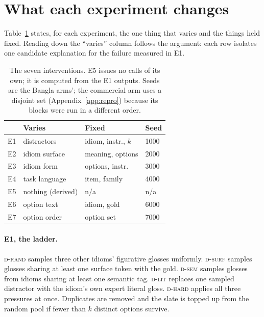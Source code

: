 \documentclass[11pt]{article}
\newcommand{\neu}[1]{\cellcolor{fGrey!55}#1}
\newcommand{\Drand}{\textsc{d-rand}}
\newcommand{\Dsurf}{\textsc{d-surf}}
\newcommand{\Dsem}{\textsc{d-sem}}
\newcommand{\Dlit}{\textsc{d-lit}}
\newcommand{\Dhard}{\textsc{d-hard}}
\begin{document}
\section{What each experiment changes}
\label{app:experiments}

Table~\ref{tab:expgrid} states, for each experiment, the one thing that varies
and the things held fixed. Reading down the ``varies'' column follows the
argument: each row isolates one candidate explanation for the failure measured
in E1.

\begin{table}[h]
\centering\small
\setlength{\tabcolsep}{3pt}
\begin{tabular}{llll}
\toprule
& \textbf{Varies} & \textbf{Fixed} & \textbf{Seed} \\
\midrule
\neu{E1} & \neu{distractors} & \neu{idiom, instr., $k$} & \neu{1000} \\
E2 & idiom surface & meaning, options & 2000 \\
E3 & idiom form & options, instr. & 3000 \\
E4 & task language & item, family & 4000 \\
\neu{E5} & \neu{nothing (derived)} & \neu{n/a} & \neu{n/a} \\
E6 & option text & idiom, gold & 6000 \\
E7 & option order & option set & 7000 \\
\bottomrule
\end{tabular}
\caption{The seven interventions. E5 issues no calls of its own; it is computed
from the E1 outputs. Seeds are the Bangla arms'; the commercial arm uses a
disjoint set (Appendix~\ref{app:repro}) because its blocks were run in a
different order.}
\label{tab:expgrid}
\end{table}

\paragraph{E1, the ladder.} \Drand{} samples three other idioms' figurative
glosses uniformly. \Dsurf{} samples glosses sharing at least one surface token
with the gold. \Dsem{} samples glosses from idioms sharing at least one semantic
tag. \Dlit{} replaces one sampled distractor with the idiom's own expert literal
gloss. \Dhard{} applies all three pressures at once. Duplicates are removed and
the slate is topped up from the random pool if fewer than $k$ distinct options
survive.
\end{document}
